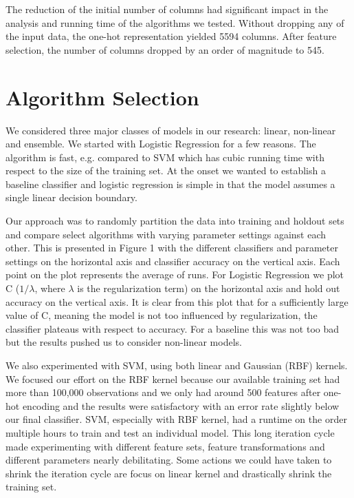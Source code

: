 \documentclass[twoside,11pt]{homework}
\begin{document}
The reduction of the initial number of columns had significant impact in the analysis and running time of the algorithms we tested. Without dropping any of the input data, the one-hot representation yielded 5594 columns. After feature selection, the number of columns dropped by an order of magnitude to 545.  


\section*{Algorithm Selection}



We considered three major classes of models in our research: linear,
non-linear and ensemble. We started with Logistic Regression for a few reasons.
The algorithm is fast, e.g. compared to SVM which has cubic running time with respect to the size of the training set.
At the onset we wanted to establish a baseline classifier and logistic regression is simple in that the model assumes a single linear 
decision boundary. 

Our approach was to randomly partition the data into training and holdout sets and compare select algorithms with varying
parameter settings against each other. This is presented in Figure 1 with the different classifiers and parameter settings on the
horizontal axis and classifier accuracy on the vertical axis. Each point on the plot represents the average of runs.
For Logistic Regression we plot C ($1/\lambda$, where $\lambda$ is the regularization term) on the horizontal axis and hold out accuracy on the vertical axis.
It is clear from this plot that for a sufficiently large value of C, meaning the model is not too influenced by regularization,
the classifier plateaus with respect to accuracy. For a baseline this was not too bad but the results pushed us
to consider non-linear models. 

We also experimented with SVM, using both linear and Gaussian (RBF) kernels. We 
focused our effort on the RBF kernel because our available training set had more 
than 100,000 observations and we only had around 500 features after one-hot 
encoding and the results were satisfactory with an error rate slightly below 
our final classifier. SVM, especially with RBF kernel, had a runtime on the order multiple hours to train
and test an individual model. This long iteration cycle made experimenting with different feature sets, feature transformations 
and different parameters nearly debilitating. Some actions we could have 
taken to shrink the iteration cycle are focus on linear kernel and drastically 
shrink the training set.
\end{document}
